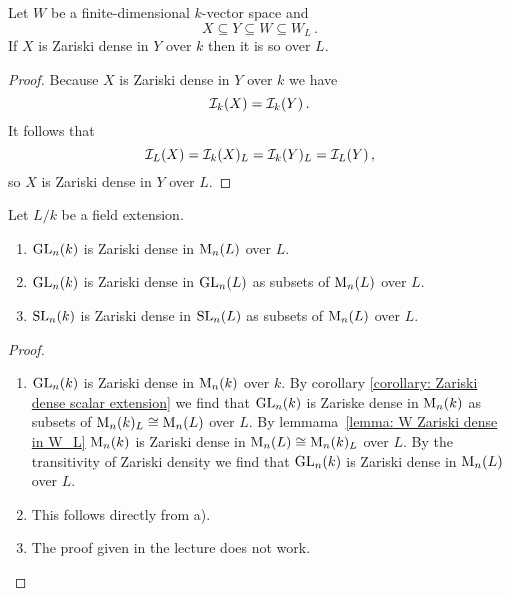 \begin{corollary}\label{corollary: Zariski dense scalar extension}
  Let $W$ be a finite-dimensional $k$-vector space and
  \[
              X
    \subseteq Y
    \subseteq W
    \subseteq W_L \,.
  \]
  If $X$ is Zariski dense in $Y$ over $k$ then it is so over $L$.
\end{corollary}
\begin{proof}
  Because $X$ is Zariski dense in $Y$ over $k$ we have
  \[
      \mathcal{I}_k(X)
    = \mathcal{I}_k(Y) \,.
  \]
  It follows that
  \[
      \mathcal{I}_L(X)
    = \mathcal{I}_k(X)_L
    = \mathcal{I}_k(Y)_L
    = \mathcal{I}_L(Y) \,,
  \]
  so $X$ is Zariski dense in $Y$ over $L$.
\end{proof}


\begin{proposition}
  Let $L/k$ be a field extension.
  \begin{enumerate}[label=\emph{\alph*)},leftmargin=*]
    \item
      $\operatorname{GL}_n(k)$ is Zariski dense in $\operatorname{M}_n(L)$ over $L$.
    \item
      $\operatorname{GL}_n(k)$ is Zariski dense in $\operatorname{GL}_n(L)$ as subsets of $\operatorname{M}_n(L)$ over $L$.
    \item
      $\operatorname{SL}_n(k)$ is Zariski dense in $\operatorname{SL}_n(L)$ as subsets of $\operatorname{M}_n(L)$ over $L$.
  \end{enumerate}
\end{proposition}
\begin{proof}
  \begin{enumerate}[label=\emph{\alph*)},leftmargin=*]
    \item
      $\operatorname{GL}_n(k)$ is Zariski dense in $\operatorname{M}_n(k)$ over $k$.
      By corollary \ref{corollary: Zariski dense scalar extension} we find that $\operatorname{GL}_n(k)$ is Zariske dense in $\operatorname{M}_n(k)$ as subsets of $\operatorname{M}_n(k)_L \cong \operatorname{M}_n(L)$ over $L$.
      By \mbox{lemmama \ref{lemma: W Zariski dense in W_L}} $\operatorname{M}_n(k)$ is Zariski dense in $\operatorname{M}_n(L) \cong \operatorname{M}_n(k)_L$ over $L$.
      By the transitivity of Zariski density we find that $\operatorname{GL}_n(k)$ is Zariski dense in $\operatorname{M}_n(L)$ over $L$.
    \item
      This follows directly from a).
    \item
      The proof given in the lecture does not work.
    \qedhere
  \end{enumerate}
\end{proof}


